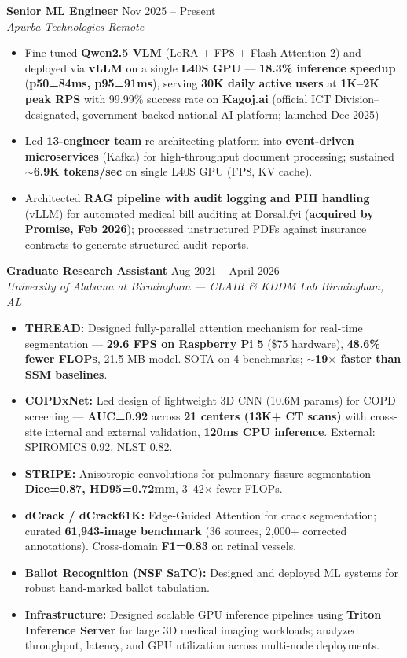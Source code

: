 \documentclass[10pt,letterpaper]{article}
\newcommand{\role}[3]{\textbf{#1} \hfill {\small\color{muted}#2}\\[-0.5pt]{\small\itshape\color{muted} #3}}
\begin{document}
\role{Senior ML Engineer}{Nov 2025 -- Present}
     {Apurba Technologies \hfill Remote}
\vspace{0.5pt}
\begin{itemize}
  \item Fine-tuned \textbf{Qwen2.5 VLM} (LoRA + FP8 + Flash Attention 2) and deployed via \textbf{vLLM} on a single \textbf{L40S GPU} --- \textbf{18.3\% inference speedup} (\textbf{p50=84ms, p95=91ms}), serving \textbf{30K daily active users} at \textbf{1K--2K peak RPS} with 99.99\% success rate on \textbf{Kagoj.ai} (official ICT Division–designated, government-backed national AI platform; launched Dec 2025)
  \item Led \textbf{13-engineer team} re-architecting platform into \textbf{event-driven microservices} (Kafka) for high-throughput document processing; sustained \textbf{$\sim$6.9K tokens/sec} on single L40S GPU (FP8, KV cache).
  \item Architected \textbf{RAG pipeline with audit logging and PHI handling} (vLLM) for automated medical bill auditing at Dorsal.fyi (\textbf{acquired by Promise, Feb 2026}); processed unstructured PDFs against insurance contracts to generate structured audit reports.
\end{itemize}
\role{Graduate Research Assistant}{Aug 2021 -- April 2026}
     {University of Alabama at Birmingham --- CLAIR \& KDDM Lab \hfill Birmingham, AL}
\begin{itemize}
\item \textbf{THREAD:} Designed fully-parallel attention mechanism for real-time segmentation --- \textbf{29.6 FPS on Raspberry Pi 5} (\$75 hardware), \textbf{48.6\% fewer FLOPs}, 21.5 MB model. SOTA on 4 benchmarks; \textbf{$\sim$19$\times$ faster than SSM baselines}.
  \item \textbf{COPDxNet:} Led design of lightweight 3D CNN (10.6M params) for COPD screening --- \textbf{AUC=0.92} across \textbf{21 centers (13K+ CT scans)} with cross-site internal and external validation, \textbf{120ms CPU inference}. External: SPIROMICS 0.92, NLST 0.82.
  \item \textbf{STRIPE:} Anisotropic convolutions for pulmonary fissure segmentation --- \textbf{Dice=0.87, HD95=0.72mm}, 3--42$\times$ fewer FLOPs.
  \item \textbf{dCrack / dCrack61K:} Edge-Guided Attention for crack segmentation; curated \textbf{61,943-image benchmark} (36 sources, 2,000+ corrected annotations). Cross-domain \textbf{F1=0.83} on retinal vessels.
  \item \textbf{Ballot Recognition (NSF SaTC):} Designed and deployed ML systems for robust hand-marked ballot tabulation.
  \item \textbf{Infrastructure:} Designed scalable GPU inference pipelines using \textbf{Triton Inference Server} for large 3D medical imaging workloads; analyzed throughput, latency, and GPU utilization across multi-node deployments.
\end{itemize}
\end{document}
